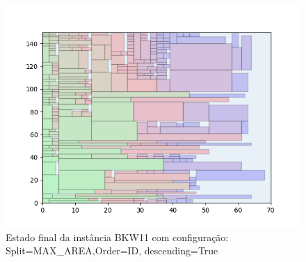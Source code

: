 \begin{figure}[H]
    \centering
    \caption[]{Estado final da instância BKW11 com configuração: Split=MAX_AREA,Order=ID, descending=True}
    \label{fig:bkw11-max_area-id-true}
    \includegraphics[scale=0.5]{output/figures/bkw/bkw11/max_area/id/true/000}
\end{figure}